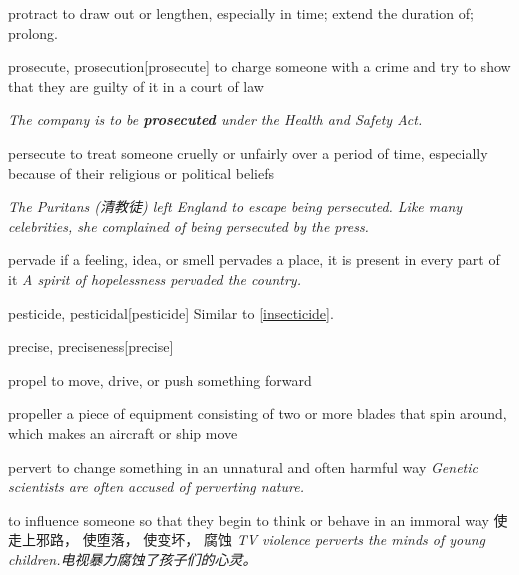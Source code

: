 \begin{DefWord}{protract}
    to draw out or lengthen, especially in time; extend the duration of; prolong.
\end{DefWord}

\begin{DefWord}{prosecute, prosecution}[prosecute]
    to charge someone with a crime and try to show that they are guilty of it in a court of law

    \textit{The company is to be \textbf{prosecuted} under the Health and Safety Act.}
\end{DefWord}

\begin{DefWord}{persecute}
    to treat someone cruelly or unfairly over a period of time, especially because of their religious or political beliefs

    \textit{The Puritans (清教徒) left England to escape being persecuted. Like many celebrities, she complained of being persecuted by the press.}
\end{DefWord}

\begin{DefWord}{pervade}
    if a feeling, idea, or smell pervades a place, it is present in every part of it
    \textit{A spirit of hopelessness pervaded the country.}
\end{DefWord}

\begin{DefWord}{pesticide, pesticidal}[pesticide]
    Similar to \ref{insecticide}.
\end{DefWord}


\begin{DefWord}{precise, preciseness}[precise]
\end{DefWord}

\begin{DefWord}{propel}
    to move, drive, or push something forward
\end{DefWord}


\begin{DefWord}{propeller}
    a piece of equipment consisting of two or more blades that spin around, which makes an aircraft or ship move
\end{DefWord}

\begin{DefWord}{pervert}
    to change something in an unnatural and often harmful way
    \textit{Genetic scientists are often accused of perverting nature.}

    to influence someone so that they begin to think or behave in an immoral way 使走上邪路， 使堕落， 使变坏， 腐蚀
    \textit{TV violence perverts the minds of young children.电视暴力腐蚀了孩子们的心灵。 }
\end{DefWord}

